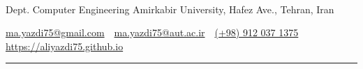 \documentclass[letterpaper,MMMyyyy,nonstopmode]{resume}
\newcommand{\CVAuthor}{Ali Yazdi}
\newcommand{\CVWebpage}{https://aliyazdi75.github.io}
\begin{document}

\Title{\CVAuthor}

\begin{SubTitle}
\href{https://www.linkedin.com/in/aliyazdi75}
{\faLinkedin}
\,\SubBulletSymbol\,
\href{https://github.com/aliyazdi75}
{\faGithub}
\,\SubBulletSymbol\,
\href{https://twitter.com/aliyazdi75}
{\faTwitter}
\,\SubBulletSymbol\,
\href{https://join.skype.com/invite/h3jUqpJH9jLh}
{\faSkype}
\,\SubBulletSymbol\,
\href{mailto:ma.yazdi75@gmail.com}
{\faEnvelope}
\,\SubBulletSymbol\,
\href{tel:+989120371375}
{\faPhone}
\,\SubBulletSymbol\,
\href{\CVWebpage}
{\faGlobe}
\par
Dept. Computer Engineering Amirkabir University, Hafez Ave., Tehran, Iran
\par
\href{mailto:ma.yazdi75@gmail.com}
{ma.yazdi75@gmail.com}
\,\SubBulletSymbol\,
\href{mailto:ma.yazdi75@aut.ac.ir}
{ma.yazdi75@aut.ac.ir}
\,\SubBulletSymbol\,
\href{tel:+989120371375}
{(+98) 912 037 1375}
\,\SubBulletSymbol\,
\href{\CVWebpage}
{\CVWebpage}
\end{SubTitle}

\smallskip\hrule
\end{document}
